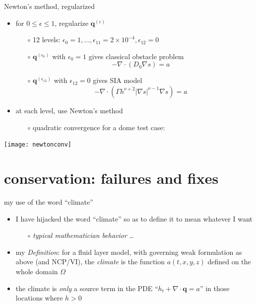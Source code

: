 \documentclass[xcolor={dvipsnames}]{beamer}
\newcommand\bq{\mathbf{q}}
\newcommand\Div{\nabla\cdot}
\newcommand\eps{\epsilon}
\newcommand\grad{\nabla}
\begin{document}
\begin{frame}{Newton's method, regularized}

\begin{itemize}
\item for $0 \le \eps \le 1$, regularize $\bq^{(\eps)}$
  \begin{itemize}
  \item[$\circ$] 12 levels: $\eps_0=1, \dots, \eps_{11}=2\times 10^{-4}, \eps_{12}=0$
  \item[$\circ$] $\bq^{(\eps_0)}$ with $\eps_0=1$ gives classical obstacle problem
    $$- \Div (D_0 \grad s) = a$$
  \item[$\circ$] $\bq^{(\eps_{12})}$ with $\eps_{12}=0$ gives SIA model
    $$- \Div (\Gamma h^{\nu+2} |\grad s|^{\nu-1} \grad s) = a$$
  \end{itemize}
\item at each level, use Newton's method
  \begin{itemize}
  \item[$\circ$] quadratic convergence for a dome test case:
  \end{itemize}
\end{itemize}

\begin{center}
\texttt{[image: newtonconv]}
\end{center}
\end{frame}


\section{conservation: failures and fixes}


\begin{frame}{my use of the word ``climate''}

\begin{itemize}
\item I have hijacked the word ``climate'' so as to define it to mean whatever I want
     \begin{itemize}
     \item[$\circ$] \emph{typical mathematician behavior} \dots
     \end{itemize}

\bigskip
\item<2> my \emph{Definition}: for a fluid layer model, with governing weak formulation as above (and NCP/VI), the \emph{\alert{climate}} is the function $a(t,x,y,z)$ defined on the whole domain $\Omega$

\bigskip
\item<2> the climate is \emph{only} a source term in the PDE ``$h_t + \Div \bq = a$'' in those locations where $h>0$
\end{itemize}
\end{frame}
\end{document}

